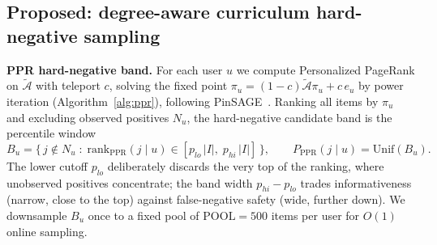 \documentclass{article}
\begin{document}
\subsection{Proposed: degree-aware curriculum hard-negative sampling}
\textbf{PPR hard-negative band.} For each user $u$ we compute Personalized
PageRank on $\tilde{\mathcal{A}}$ with teleport $c$, solving the fixed point
$\pi_u=(1-c)\tilde{\mathcal{A}}\pi_u+c\,e_u$ by power iteration (Algorithm~\ref{alg:ppr}),
following PinSAGE~\cite{pinsage}. Ranking all items by $\pi_u$ and excluding observed
positives $N_u$, the hard-negative candidate band is the percentile window
\[
B_u=\big\{\,j\notin N_u \;:\; \mathrm{rank}_{\mathrm{PPR}}(j\mid u)\in
[p_{lo}\,|I|,\;p_{hi}\,|I|]\,\big\},
\qquad P_{\mathrm{PPR}}(j\mid u)=\mathrm{Unif}(B_u).
\]
The lower cutoff $p_{lo}$ deliberately discards the very top of the ranking, where
unobserved positives concentrate; the band width $p_{hi}-p_{lo}$ trades
informativeness (narrow, close to the top) against false-negative safety (wide,
further down). We downsample $B_u$ once to a fixed pool of $\mathrm{POOL}=500$ items
per user for $O(1)$ online sampling.
\end{document}
